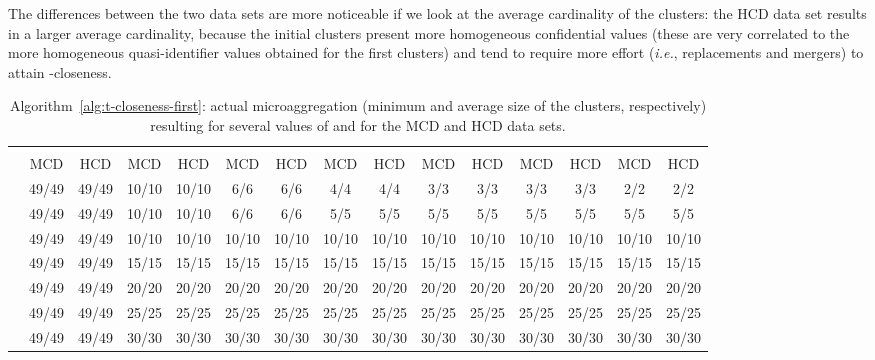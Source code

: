 \documentclass[10pt,journal,compsoc]{IEEEtran}
\theoremstyle{definition}
\theoremstyle{plain}
\begin{document}
The differences between the two data sets are more noticeable if we look at the
average cardinality of the clusters: the HCD data set results in a larger average cardinality,
because the initial clusters present more homogeneous 
confidential values (these are very correlated to the more homogeneous
quasi-identifier values obtained for the first clusters) 
and tend to require more effort ({\em i.e.}, replacements and mergers) 
to attain -closeness. 

\begin{table*}
\caption{\label{tab:t-closeness-first}Algorithm~\ref{alg:t-closeness-first}: actual microaggregation (minimum and average
size of the clusters, respectively) resulting for several values of  and  for the MCD and HCD data sets.}
\centering
\scriptsize
\begin{tabular}{|l|cc|cc|cc|cc|cc|cc|cc|}\hline
 & \multicolumn{2}{c|}{} & \multicolumn{2}{c|}{} & \multicolumn{2}{c|}{} & \multicolumn{2}{c|}{} & \multicolumn{2}{c|}{} & \multicolumn{2}{c|}{} & \multicolumn{2}{c|}{}\\
& MCD & HCD & MCD & HCD & MCD & HCD & MCD & HCD & MCD & HCD & MCD & HCD & MCD & HCD\\
\hline
 & 49/49 & 49/49  & 10/10 & 10/10  & 6/6 & 6/6 & 4/4 & 4/4 & 3/3 & 3/3 & 3/3 & 3/3 & 2/2 & 2/2 \\
 & 49/49 & 49/49  & 10/10 & 10/10  & 6/6 & 6/6 & 5/5 & 5/5 & 5/5 & 5/5 & 5/5 & 5/5 & 5/5 & 5/5 \\
 & 49/49 & 49/49  & 10/10 & 10/10  & 10/10 & 10/10 & 10/10 & 10/10 & 10/10 & 10/10 & 10/10 & 10/10 & 10/10 & 10/10 \\
 & 49/49 & 49/49  & 15/15 & 15/15  & 15/15 & 15/15 & 15/15 & 15/15 & 15/15 & 15/15 & 15/15 & 15/15 & 15/15 & 15/15 \\
 & 49/49 & 49/49  & 20/20 & 20/20  & 20/20 & 20/20 & 20/20 & 20/20 & 20/20 & 20/20 & 20/20 & 20/20 & 20/20 & 20/20 \\
 & 49/49 & 49/49  & 25/25 & 25/25  & 25/25 & 25/25 & 25/25 & 25/25 & 25/25 & 25/25 & 25/25 & 25/25 & 25/25 & 25/25 \\
 & 49/49 & 49/49  & 30/30 & 30/30  & 30/30 & 30/30 & 30/30 & 30/30 & 30/30 & 30/30 & 30/30 & 30/30 & 30/30 & 30/30 \\
\hline
\end{tabular}
\end{table*}
\end{document}
